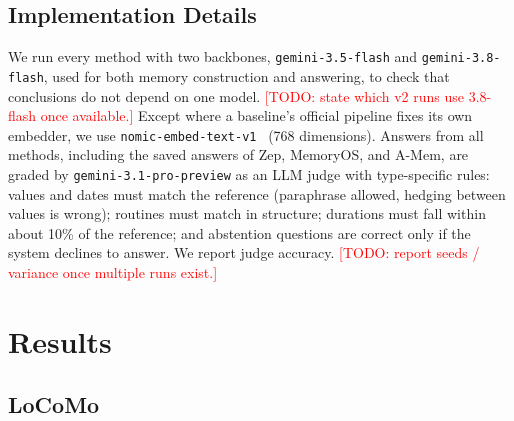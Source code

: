 \documentclass[11pt]{article}
\newcommand{\todo}[1]{\textcolor{red}{[TODO: #1]}}
\begin{document}
\subsection{Implementation Details}

We run every method with two backbones, \texttt{gemini-3.5-flash} and \texttt{gemini-3.8-flash}, used for both memory construction and answering, to check that conclusions do not depend on one model. \todo{state which v2 runs use 3.8-flash once available.} Except where a baseline's official pipeline fixes its own embedder, we use \texttt{nomic-embed-text-v1}~\citep{nussbaum2024nomic} (768 dimensions). Answers from all methods, including the saved answers of Zep, MemoryOS, and A-Mem, are graded by \texttt{gemini-3.1-pro-preview} as an LLM judge with type-specific rules: values and dates must match the reference (paraphrase allowed, hedging between values is wrong); routines must match in structure; durations must fall within about 10\% of the reference; and abstention questions are correct only if the system declines to answer. We report judge accuracy. \todo{report seeds / variance once multiple runs exist.}

\section{Results}
\label{sec:results}

\subsection{LoCoMo}
\end{document}
